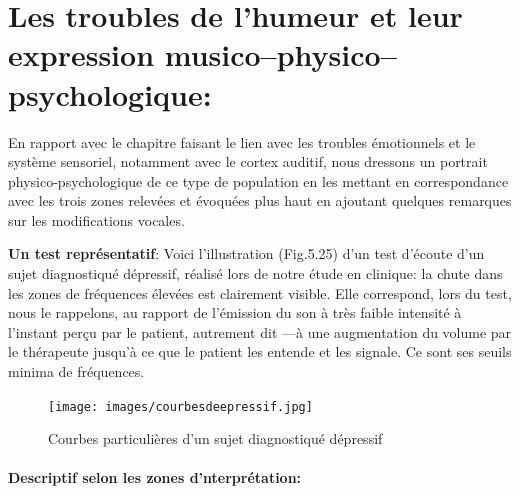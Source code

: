   
     







 




   
  \section{Les troubles de l'humeur et leur expression
    musico--physico--psychologique:}
 En rapport  avec le chapitre faisant le lien avec les troubles
 émotionnels et le
système sensoriel, notamment avec le cortex auditif, nous
dressons un portrait
physico-psychologique de ce type de population 
  en les mettant en correspondance avec les trois zones relevées et
  évoquées plus haut en ajoutant quelques remarques sur 
  les modifications vocales.

  \textbf{Un test représentatif}: 
Voici l'illustration (Fig.5.25) d'un test
d'écoute d'un sujet diagnostiqué dépressif, réalisé lors de notre
étude en clinique: la
chute dans les zones de fréquences élevées est
clairement visible. Elle correspond, lors du test, nous le
rappelons, au rapport de l'émission du son à très faible intensité à 
l'instant perçu par le
patient, autrement dit  ---à une augmentation
du volume 
par le thérapeute jusqu'à ce que le patient les entende et les signale.
Ce sont ses seuils minima de fréquences.
 \begin{figure}[ht]
	\centering
	\texttt{[image: images/courbesdeepressif.jpg]}
	\caption{Courbes particulières d'un sujet diagnostiqué dépressif}
	\label{fig:courbes du dépressif}
      \end{figure}




      \paragraph{Descriptif selon les zones d'nterprétation:}

